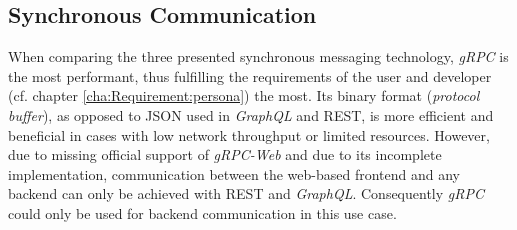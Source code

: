 
\subsection{Synchronous Communication}\label{cha:Technologies:selection:synchronous}

When comparing the three presented synchronous messaging technology, \textit{gRPC} is the most performant, thus fulfilling the requirements of the user and developer (cf. chapter \ref{cha:Requirement:persona}) the most.
Its binary format (\textit{protocol buffer}), as opposed to \ac{JSON} used in \textit{GraphQL} and \ac{REST}, is more efficient and beneficial in cases with low network throughput or limited resources.
However, due to missing official support of \textit{gRPC-Web} and due to its incomplete implementation, communication between the web-based frontend and any backend can only be achieved with \ac{REST} and \textit{GraphQL}.
Consequently \textit{gRPC} could only be used for backend communication in this use case.

